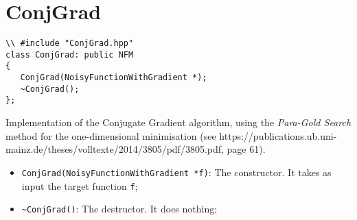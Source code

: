 \documentclass[11pt,a4paper,twoside]{article}
\begin{document}



\section{ConjGrad} %
\label{sec:conjgrad}

\begin{verbatim}
\\ #include "ConjGrad.hpp"
class ConjGrad: public NFM
{
   ConjGrad(NoisyFunctionWithGradient *);
   ~ConjGrad();   
};
\end{verbatim}

Implementation of the Conjugate Gradient algorithm, using the \emph{Para-Gold Search} method for the one-dimensional minimisation (see https://publications.ub.uni-mainz.de/theses/volltexte/2014/3805/pdf/3805.pdf, page 61).

\begin{itemize}
   \item \verb+ConjGrad(NoisyFunctionWithGradient *f)+: The constructor. It takes as input the target function \verb+f+;
   \item \verb+~ConjGrad()+: The destructor. It does nothing;
\end{itemize}




\printindex
\end{document}
